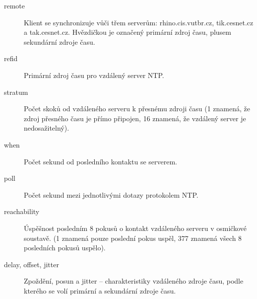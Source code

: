 \begin{description}

  \item[remote] Klient se synchronizuje vůči třem serverům: rhino.cis.vutbr.cz,
    tik.cesnet.cz a tak.cesnet.cz. Hvězdičkou je označený primární zdroj času,
    plusem sekundární zdroje času.

  \item[refid] Primární zdroj času pro vzdálený server NTP.

  \item[stratum] Počet skoků od vzdáleného serveru k přesnému zdroji času (1
    znamená, že zdroj přesného času je přímo připojen, 16 znamená, že vzdálený
    server je nedosažitelný).

  \item[when] Počet sekund od posledního kontaktu se serverem.

  \item[poll] Počet sekund mezi jednotlivými dotazy protokolem NTP.

  \item[reachability] Úspěšnost posledním 8 pokusů o kontakt vzdáleného serveru
    v osmičkové soustavě. (1 znamená pouze poslední pokus uspěl, 377 znamená
    všech 8 posledních pokusů uspělo).

  \item[delay, offset, jitter] Zpoždění, posun a jitter -- charakteristiky
    vzdáleného zdroje času, podle kterého se volí primární a sekundární zdroje
    času.
\end{description}
